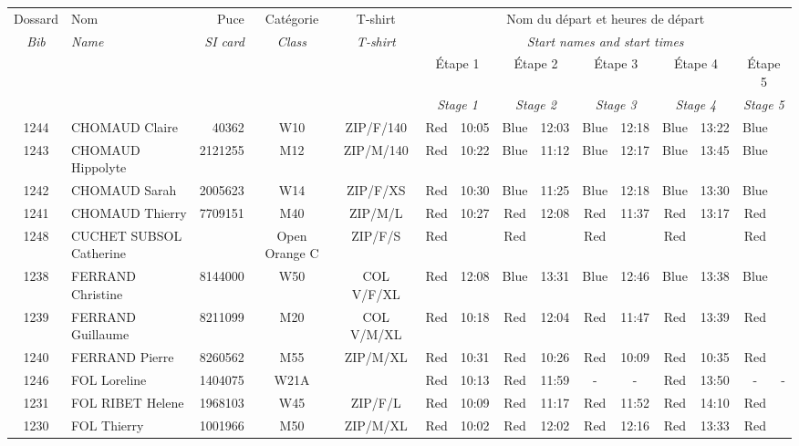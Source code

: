 \documentclass{report}
\begin{document}
  \begin{longtable}{|c|l|r|c|c|*{5}{cc|}}
    Dossard & Nom  & Puce    & Catégorie & T-shirt & \multicolumn{10}{c|}{Nom du départ et heures de départ} \\
    \itshape Bib     & \itshape Name & \itshape SI card & \itshape Class  & \itshape  T-shirt  & \multicolumn{10}{c|}{\itshape Start names and start times} \\
    \hline
    & & & & & \multicolumn{2}{c|}{Étape 1} & \multicolumn{2}{c|}{Étape 2} & \multicolumn{2}{c|}{Étape 3} & \multicolumn{2}{c|}{Étape 4} & \multicolumn{2}{c|}{Étape 5} \\
    & & & & & \multicolumn{2}{c|}{\itshape Stage 1} & \multicolumn{2}{c|}{\itshape Stage 2} & \multicolumn{2}{c|}{\itshape Stage 3} & \multicolumn{2}{c|}{\itshape Stage 4} & \multicolumn{2}{c|}{\itshape Stage 5} \\
    \hline
    1244 & CHOMAUD Claire & 40362 & W10 & ZIP/F/140 & Red & 10:05 & Blue & 12:03 & Blue & 12:18 & Blue & 13:22 & Blue &  \\
    1243 & CHOMAUD Hippolyte & 2121255 & M12 & ZIP/M/140 & Red & 10:22 & Blue & 11:12 & Blue & 12:17 & Blue & 13:45 & Blue &  \\
    1242 & CHOMAUD Sarah & 2005623 & W14 & ZIP/F/XS & Red & 10:30 & Blue & 11:25 & Blue & 12:18 & Blue & 13:30 & Blue &  \\
    1241 & CHOMAUD Thierry & 7709151 & M40 & ZIP/M/L & Red & 10:27 & Red & 12:08 & Red & 11:37 & Red & 13:17 & Red &  \\
    1248 & CUCHET SUBSOL Catherine &  & Open Orange C & ZIP/F/S & Red &   & Red &   & Red &   & Red &   & Red &  \\
    1238 & FERRAND Christine & 8144000 & W50 & COL V/F/XL & Red & 12:08 & Blue & 13:31 & Blue & 12:46 & Blue & 13:38 & Blue &  \\
    1239 & FERRAND Guillaume & 8211099 & M20 & COL V/M/XL & Red & 10:18 & Red & 12:04 & Red & 11:47 & Red & 13:39 & Red &  \\
    1240 & FERRAND Pierre & 8260562 & M55 & ZIP/M/XL & Red & 10:31 & Red & 10:26 & Red & 10:09 & Red & 10:35 & Red &  \\
    1246 & FOL Loreline & 1404075 & W21A &   & Red & 10:13 & Red & 11:59 & - &  - & Red & 13:50 & - &  -\\
    1231 & FOL RIBET Helene & 1968103 & W45 & ZIP/F/L & Red & 10:09 & Red & 11:17 & Red & 11:52 & Red & 14:10 & Red &  \\
    1230 & FOL Thierry & 1001966 & M50 & ZIP/M/XL & Red & 10:02 & Red & 12:02 & Red & 12:16 & Red & 13:33 & Red &  \\

\end{longtable}
\end{document}
